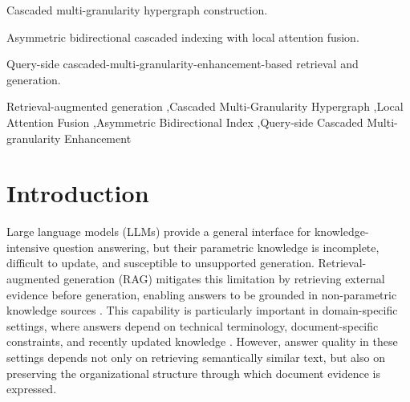 \documentclass[a4paper,fleqn]{cas-dc}
\begin{document}
\begin{highlights}
\item Cascaded multi-granularity hypergraph construction.
\item Asymmetric bidirectional cascaded indexing with local attention fusion.
\item Query-side cascaded-multi-granularity-enhancement-based retrieval and generation.
\end{highlights}


\begin{keywords}
Retrieval-augmented generation  \sep Cascaded Multi-Granularity Hypergraph \sep Local Attention Fusion \sep Asymmetric Bidirectional Index \sep Query-side Cascaded Multi-granularity Enhancement
\end{keywords}

\maketitle

\section{Introduction}

Large language models (LLMs) provide a general interface for knowledge-intensive question answering, but their parametric knowledge is incomplete, difficult to update, and susceptible to unsupported generation. Retrieval-augmented generation (RAG) mitigates this limitation by retrieving external evidence before generation, enabling answers to be grounded in non-parametric knowledge sources \citep{Lewis2020RAG}. This capability is particularly important in domain-specific settings, where answers depend on technical terminology, document-specific constraints, and recently updated knowledge \citep{Yang2025KBSLLMKB}. However, answer quality in these settings depends not only on retrieving semantically similar text, but also on preserving the organizational structure through which document evidence is expressed.
\end{document}
